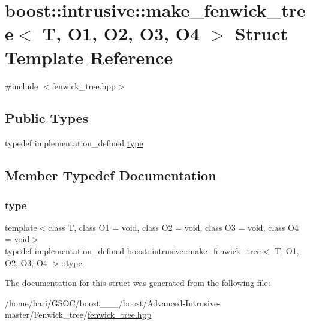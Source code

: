 \hypertarget{structboost_1_1intrusive_1_1make__fenwick__tree}{}\section{boost\+:\+:intrusive\+:\+:make\+\_\+fenwick\+\_\+tree$<$ T, O1, O2, O3, O4 $>$ Struct Template Reference}
\label{structboost_1_1intrusive_1_1make__fenwick__tree}


{\ttfamily \#include $<$fenwick\+\_\+tree.\+hpp$>$}

\subsection*{Public Types}
\begin{DoxyCompactItemize}
\item 
typedef implementation\+\_\+defined \hyperlink{structboost_1_1intrusive_1_1make__fenwick__tree_a174edb4a4fedde7b29f7aa9362d37ac0}{type}
\end{DoxyCompactItemize}


\subsection{Member Typedef Documentation}
\mbox{\label{structboost_1_1intrusive_1_1make__fenwick__tree_a174edb4a4fedde7b29f7aa9362d37ac0}} 
\subsubsection{\texorpdfstring{type}{type}}
{\footnotesize\ttfamily template$<$class T, class O1 = void, class O2 = void, class O3 = void, class O4 = void$>$ \\
typedef implementation\+\_\+defined \hyperlink{structboost_1_1intrusive_1_1make__fenwick__tree}{boost\+::intrusive\+::make\+\_\+fenwick\+\_\+tree}$<$ T, O1, O2, O3, O4 $>$\+::\hyperlink{structboost_1_1intrusive_1_1make__fenwick__tree_a174edb4a4fedde7b29f7aa9362d37ac0}{type}}



The documentation for this struct was generated from the following file\+:\begin{DoxyCompactItemize}
\item 
/home/hari/\+G\+S\+O\+C/boost\+\_\+\_\+\_/boost/\+Advanced-\/\+Intrusive-\/master/\+Fenwick\+\_\+tree/\hyperlink{fenwick__tree_8hpp}{fenwick\+\_\+tree.\+hpp}\end{DoxyCompactItemize}
